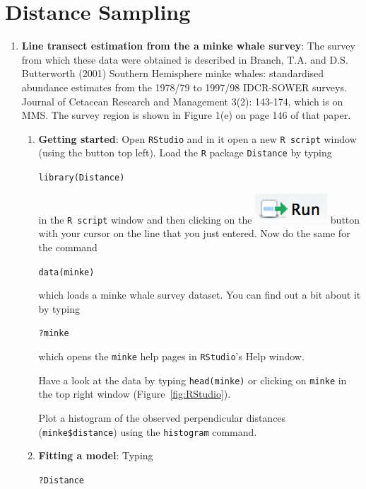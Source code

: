 \chapter{Distance Sampling\label{sec:dist_comp}}



\begin{enumerate}

\item \textbf{Line transect estimation from the a minke whale survey}: The survey from which these data were obtained is described in Branch, T.A. and D.S. Butterworth (2001) Southern Hemisphere minke whales: standardised abundance estimates from the 1978/79 to 1997/98 IDCR-SOWER surveys. Journal of Cetacean Research and Management 3(2): 143-174, which is on MMS. The survey region is shown in Figure 1(e) on page 146 of that paper.

\begin{enumerate}

\item \textbf{Getting started}: Open \texttt{RStudio} and in it open a new \texttt{R script} window (using the button top left). Load the \texttt{R} package \texttt{Distance} by typing 

\verb|library(Distance)|

in the \texttt{R script} window and then clicking on the \includegraphics[scale=0.7]{Run.png} button with your cursor on the line that you just entered. Now do the same for the command

\verb|data(minke)|

which loads a minke whale survey dataset. You can find out a bit about it by typing 

\verb|?minke|

which opens the \texttt{minke} help pages in \texttt{RStudio}'s Help window. 

Have a look at the data by typing \verb|head(minke)| or clicking on \verb|minke| in the top right window (Figure~\ref{fig:RStudio}).

Plot a histogram of the observed perpendicular distances (\verb|minke$distance|) using the \verb|histogram| command.

\item \textbf{Fitting a model}: Typing

\verb|?Distance|


\end{enumerate}
\end{enumerate}
